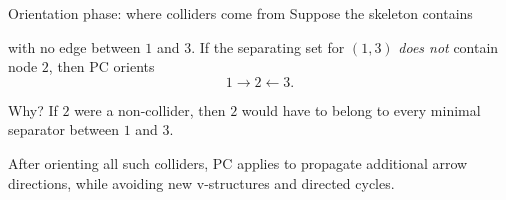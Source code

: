 \documentclass[dvipsnames,aspectratio=169,handout]{beamer}
\begin{document}
\begin{frame}{Orientation phase: where colliders come from}
Suppose the skeleton contains

\begin{center}
\end{center}

with no edge between $1$ and $3$.
If the separating set for $(1,3)$ \emph{does not} contain node $2$, then PC orients
\[
1\to 2 \leftarrow 3.
\]

\begin{alertblock}{Why?}
If $2$ were a non-collider, then $2$ would have to belong to every minimal separator between $1$ and $3$.
\end{alertblock}

\begin{block}{}
After orienting all such colliders, PC applies  to propagate additional arrow directions,
while avoiding new v-structures and directed cycles.
\end{block}

\end{frame}
\end{document}
